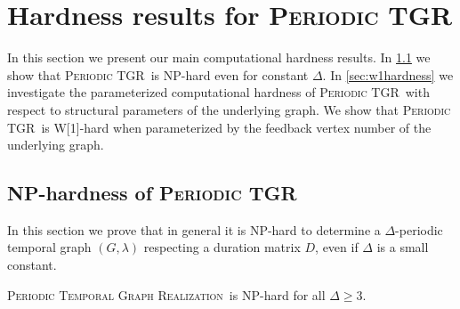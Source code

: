 \documentclass[a4paper,UKenglish,cleveref, autoref, thm-restate, anonymous]{lipics-v2021}
\newcommand{\NP}{\textrm{NP}}
\newcommand{\deltaExactLong}{\textsc{Periodic Temporal Graph Realization}}
\newcommand{\deltaExact}{\textsc{Periodic TGR}}
\begin{document}
\section{Hardness results for \deltaExact}\label{sec:hardness}
In this section we present our main computational hardness results. In \cref{sec:nphardness} we show that \deltaExact\ is NP-hard even for constant $\Delta$. In \cref{sec:w1hardness} we investigate the parameterized computational hardness of \deltaExact\ with respect to structural parameters of the underlying graph. We show that \deltaExact\ is W[1]-hard when parameterized by the feedback vertex number of the underlying graph.

\subsection{NP-hardness of \deltaExact}\label{sec:nphardness}
In this section we prove that in general it is NP-hard to determine a $\Delta$-periodic temporal graph $(G,\lambda)$ respecting a duration matrix $D$,
even if $\Delta$ is a small constant.

\begin{theorem}\label{thm:NPhardness}
	\deltaExactLong\ is \NP-hard for all $\Delta \geq 3$.
\end{theorem}
\end{document}
